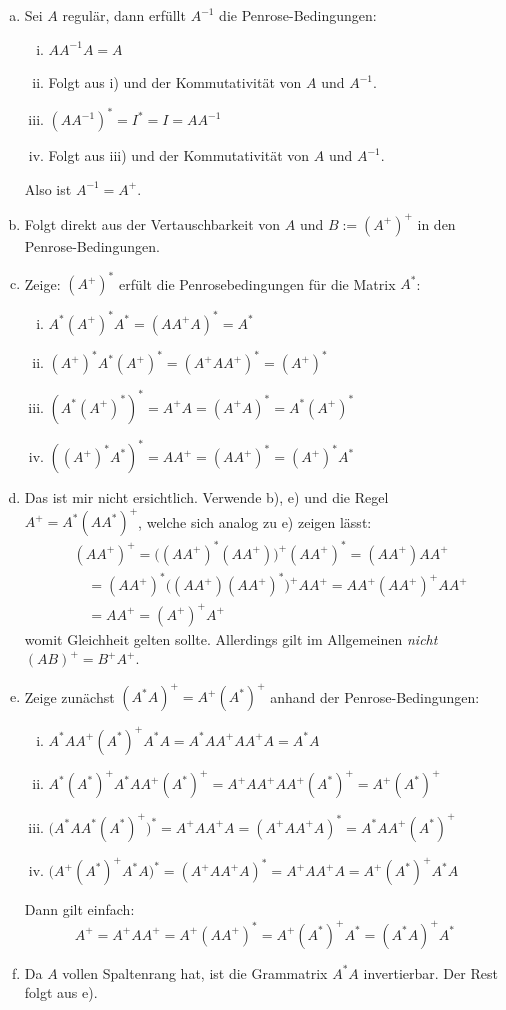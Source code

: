 \documentclass{mywork}
\begin{document}
\begin{aufgabe}
	\begin{enumerate}[a)]
		\item
			Sei $A$ regulär, dann erfüllt $A^{-1}$ die Penrose-Bedingungen:
			\begin{enumerate}[i)]
				\item
					$AA^{-1}A = A$
				\item
					Folgt aus i) und der Kommutativität von $A$ und $A^{-1}$.
				\item
					$(AA^{-1})^* = I^* = I = AA^{-1}$
				\item
					Folgt aus iii) und der Kommutativität von $A$ und $A^{-1}$.
			\end{enumerate}
			Also ist $A^{-1} = A^+$.
		\item
			Folgt direkt aus der Vertauschbarkeit von $A$ und $B:=(A^+)^+$ in den Penrose-Bedingungen.
		\item
			Zeige: $(A^+)^*$ erfült die Penrosebedingungen für die Matrix $A^*$:
			\begin{enumerate}[i)]
				\item
					$A^*(A^+)^*A^* = (AA^+A)^* = A^*$
				\item
					$(A^+)^*A^*(A^+)^* = (A^+AA^+)^* = (A^+)^*$
				\item
					$(A^*(A^+)^*)^* = A^+A = (A^+A)^* = A^*(A^+)^*$
				\item
					$((A^+)^*A^*)^* = AA^+ = (AA^+)^* = (A^+)^*A^*$
			\end{enumerate}
		\item
			Das ist mir nicht ersichtlich.
			Verwende b), e) und die Regel $A^+ = A^*(AA^*)^+$, welche sich analog zu e) zeigen lässt:
			\begin{align*}
				&(AA^+)^+ 
				= \Big((AA^+)^*(AA^+)\Big)^+(AA^+)^*
				= (AA^+)AA^+\\
				&\quad= (AA^+)^*\Big((AA^+)(AA^+)^*\Big)^+ AA^+
				= AA^+(AA^+)^+AA^+ \\
				&\quad= AA^+
				= (A^+)^+A^+
			\end{align*}
			womit Gleichheit gelten sollte.
			Allerdings gilt im Allgemeinen \emph{nicht} $(AB)^+ = B^+A^+$.
		\item
			Zeige zunächst $(A^*A)^+ = A^+(A^*)^+$ anhand der Penrose-Bedingungen:
			\begin{enumerate}[i)]
				\item
					$A^*AA^+(A^*)^+A^*A = A^*AA^+AA^+A = A^*A$
				\item
					$A^*(A^*)^+A^*AA^+(A^*)^+ = A^+AA^+AA^+(A^*)^+ = A^+(A^*)^+$
				\item
					$\big(A^*AA^*(A^*)^+\big)^* = A^+AA^+A = (A^+AA^+A)^* = A^*AA^+(A^*)^+$
				\item
					$\big(A^+(A^*)^+A^*A\big)^* = (A^+AA^+A)^* = A^+AA^+A = A^+(A^*)^+A^*A$
			\end{enumerate}
			Dann gilt einfach:
			\[
				A^+ = A^+AA^+ = A^+(AA^+)^* = A^+(A^*)^+A^* = (A^*A)^+A^*
			\]
		\item
			Da $A$ vollen Spaltenrang hat, ist die Grammatrix $A^*A$ invertierbar.
			Der Rest folgt aus e).
	\end{enumerate}
\end{aufgabe}
\end{document}
